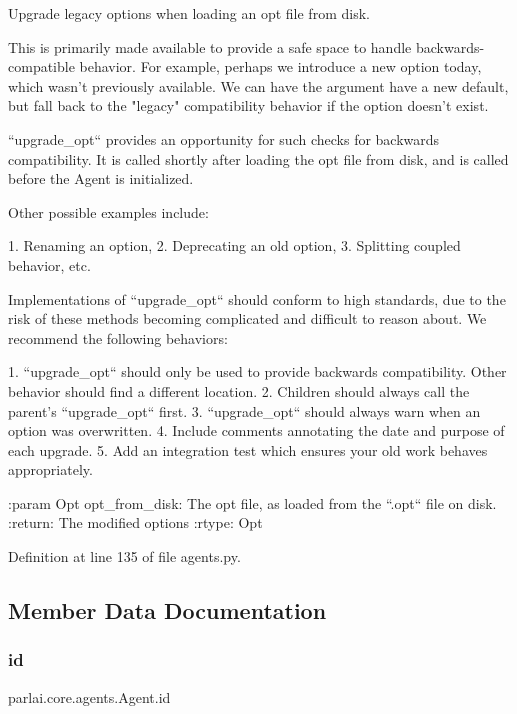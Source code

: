 \begin{DoxyVerb}Upgrade legacy options when loading an opt file from disk.

This is primarily made available to provide a safe space to handle
backwards-compatible behavior. For example, perhaps we introduce a
new option today, which wasn't previously available. We can have the
argument have a new default, but fall back to the "legacy" compatibility
behavior if the option doesn't exist.

``upgrade_opt`` provides an opportunity for such checks for backwards
compatibility. It is called shortly after loading the opt file from
disk, and is called before the Agent is initialized.

Other possible examples include:

    1. Renaming an option,
    2. Deprecating an old option,
    3. Splitting coupled behavior, etc.

Implementations of ``upgrade_opt`` should conform to high standards,
due to the risk of these methods becoming complicated and difficult to
reason about. We recommend the following behaviors:

    1. ``upgrade_opt`` should only be used to provide backwards
    compatibility.  Other behavior should find a different location.
    2. Children should always call the parent's ``upgrade_opt`` first.
    3. ``upgrade_opt`` should always warn when an option was overwritten.
    4. Include comments annotating the date and purpose of each upgrade.
    5. Add an integration test which ensures your old work behaves
    appropriately.

:param Opt opt_from_disk:
    The opt file, as loaded from the ``.opt`` file on disk.
:return:
    The modified options
:rtype:
    Opt
\end{DoxyVerb}
 

Definition at line 135 of file agents.\+py.



\subsection{Member Data Documentation}
\mbox{\label{classparlai_1_1core_1_1agents_1_1Agent_ac00c13f4c7dd1263bf9203fa96dd2366}} 
\subsubsection{\texorpdfstring{id}{id}}
{\footnotesize\ttfamily parlai.\+core.\+agents.\+Agent.\+id}



